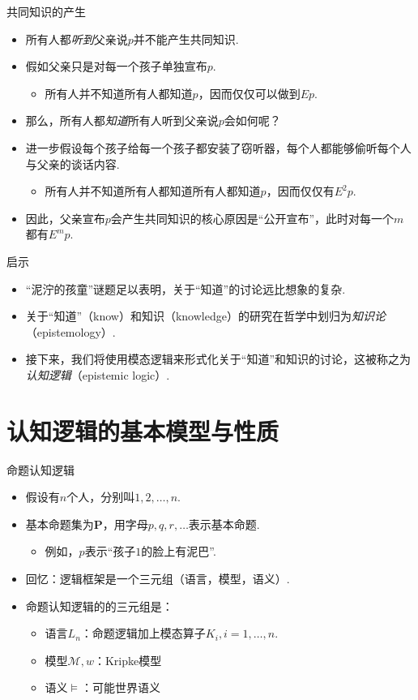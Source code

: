 {共同知识的产生}
\begin{itemize}
    \item 所有人都\emph{听到}父亲说$p$并不能产生共同知识.
    \item 假如父亲只是对每一个孩子单独宣布$p$.
    \begin{itemize}
        \item 所有人并不知道所有人都知道$p$，因而仅仅可以做到$E p$.
    \end{itemize}
    \item 那么，所有人都\emph{知道}所有人听到父亲说$p$会如何呢？
    \item 进一步假设每个孩子给每一个孩子都安装了窃听器，每个人都能够偷听每个人与父亲的谈话内容.
    \begin{itemize}
        \item 所有人并不知道所有人都知道所有人都知道$p$，因而仅仅有$E^2 p$.
    \end{itemize}
    \item 因此，父亲宣布$p$会产生共同知识的核心原因是“公开宣布”，此时对每一个$m$都有$E^m p$.
\end{itemize}


{启示}
\begin{itemize}
    \item “泥泞的孩童”谜题足以表明，关于“知道”的讨论远比想象的复杂.
    \item 关于“知道”（know）和知识（knowledge）的研究在哲学中划归为\emph{知识论}（epistemology）.
    \item 接下来，我们将使用模态逻辑来形式化关于“知道”和知识的讨论，这被称之为\emph{认知逻辑}（epistemic logic）.
\end{itemize}


\section{认知逻辑的基本模型与性质}
{命题认知逻辑}
\begin{itemize}
    \item 假设有$n$个人，分别叫$1,2,\dots,n$.
    \item 基本命题集为$\mathbf P$，用字母$p,q,r,\dots$表示基本命题.
    \begin{itemize}
        \item 例如，$p$表示“孩子$1$的脸上有泥巴”.
    \end{itemize}
    \item 回忆：逻辑框架是一个三元组（语言，模型，语义）.
    \item 命题认知逻辑的的三元组是：
    \begin{itemize}
        \item 语言$L_n$：命题逻辑加上模态算子$K_i,i=1,\dots,n$.
        \item 模型$\mathcal M,w$：Kripke模型
        \item 语义$\vDash$：可能世界语义
    \end{itemize}
\end{itemize}

